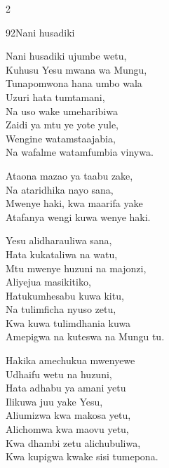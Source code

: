 \documentclass{article}
\begin{document}
\begin{multicols}{2}
\begin{hymn}{92}{Nani husadiki}{}
\begin{stanza}
Nani husadiki ujumbe wetu,\\
Kuhusu Yesu mwana wa Mungu,\\
Tunapomwona hana umbo wala\\
Uzuri hata tumtamani,\\
Na uso wake umeharibiwa\\
Zaidi ya mtu ye yote yule,\\
Wengine watamstaajabia,\\
Na wafalme watamfumbia vinywa.
\end{stanza}
\begin{chorus}
Ataona mazao ya taabu zake,\\
Na ataridhika nayo sana,\\
Mwenye haki, kwa maarifa yake\\
Atafanya wengi kuwa wenye haki.
\end{chorus}
\begin{stanza}
Yesu alidharauliwa sana,\\
Hata kukataliwa na watu,\\
Mtu mwenye huzuni na majonzi,\\
Aliyejua masikitiko,\\
Hatukumhesabu kuwa kitu,\\
Na tulimficha nyuso zetu,\\
Kwa kuwa tulimdhania kuwa\\
Amepigwa na kuteswa na Mungu tu.
\end{stanza}
\begin{stanza}
Hakika amechukua mwenyewe\\
Udhaifu wetu na huzuni,\\
Hata adhabu ya amani yetu\\
Ilikuwa juu yake Yesu,\\
Aliumizwa kwa makosa yetu,\\
Alichomwa kwa maovu yetu,\\
Kwa dhambi zetu alichubuliwa,\\
Kwa kupigwa kwake sisi tumepona.
\end{stanza}
\end{hymn}


\end{multicols}
\end{document}
